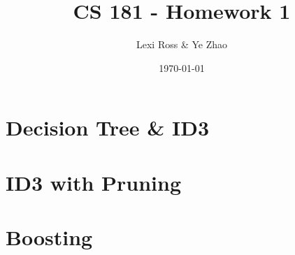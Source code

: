 \documentclass[11pt]{article}
\title{\bf CS 181 - Homework 1}
\date{\today}
\author{Lexi Ross \& Ye Zhao}
\begin{document}
\maketitle
\section{Decision Tree \& ID3}

\section{ID3 with Pruning}

\section{Boosting}
\end{document}
